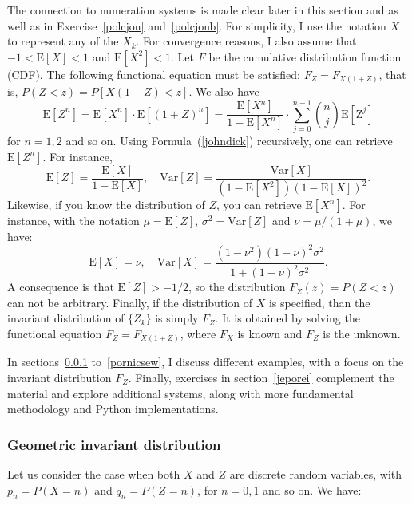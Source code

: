 \documentclass[oneside,10pt]{book}
\begin{document}
The connection to numeration systems is made clear later in this section and as well as in Exercise~\ref{polcjon} and~\ref{polcjonb}. For simplicity, I use the notation $X$ to represent any of the $X_k$. For convergence reasons, I also assume that $-1<\text{E}[X]< 1$ and $\text{E}[X^2]<1$.
Let $F$ be the cumulative distribution
 function (CDF). 
The following \textcolor{index}{functional equation} must be satisfied: 
$F_Z = F_{X(1+Z)}$, that is, $P(Z<z) = P[X(1+Z)<z]$. We also have
\begin{equation}
\text{E}[Z^n] =\text{E}[X^n]\cdot \text{E}[(1+Z)^n] = \frac{\text{E}[X^n]}{1-\text{E}[X^n]} 
 \cdot\sum_{j=0}^{n-1} \binom{n}{j} \text{E}[\text{Z}^j] \label{johndick} 
\end{equation}
 for $n=1,2$ and so on. Using Formula~(\ref{johndick}) recursively, one can retrieve 
$\text{E}[Z^n]$. For instance,
$$
\text{E}[Z] = \frac{\text{E}[X]}{1-\text{E}[X]}, \quad \text{Var}[Z] = \frac{\text{Var}[X]}{(1-\text{E}[X^2])(1-\text{E}[X])^2}.
$$
Likewise, if you know the distribution of $Z$, you can retrieve $\text{E}[X^n]$. For instance, 
with the notation $\mu=\text{E}[Z]$, $\sigma^2=\text{Var}[Z]$ and $\nu=\mu/(1+\mu)$, we have:
$$
\text{E}[X] = \nu, \quad \text{Var}[X] = \frac{(1-\nu^2)(1-\nu)^2 \sigma^2}{1 + (1-\nu)^2\sigma^2}.
$$
A consequence is that $\text{E}[Z]> -1/2$, so the distribution $F_Z(z) = P(Z<z)$ can not be arbitrary. Finally,
  if the distribution of $X$ is specified, than the \textcolor{index}{invariant distribution} 
 of $\{Z_k\}$ is simply $F_Z$. It is obtained by solving the functional equation $F_Z = F_{X(1+Z)}$, where $F_X$ is known
  and $F_Z$ is the unknown.

In sections~\ref{geoger} to~\ref{pornicsew}, I discuss different examples, with a focus on the invariant distribution $F_Z$.
 Finally, exercises in section~\ref{jeporei} complement the material and explore additional systems, along with
 more fundamental methodology and Python implementations.

\subsubsection{Geometric invariant distribution}\label{geoger}

Let us consider the case when both $X$ and $Z$ are discrete random variables, with
$p_n=P(X = n)$ and $q_n = P(Z=n)$, for $n=0,1$ and so on. We have:\vspace{1ex}
\end{document}

